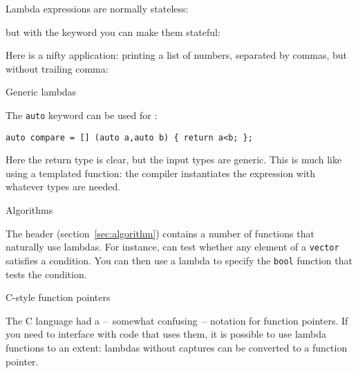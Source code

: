 Lambda expressions are normally stateless:


but with the  keyword you can
make them stateful:


Here is a nifty application: printing a list of numbers,
separated by commas, but without trailing comma:
%

 {Generic lambdas}
\label{sec:lambda-generic}

The \lstinline{auto} keyword can be used for
:
\begin{lstlisting}
auto compare = [] (auto a,auto b) { return a<b; };
\end{lstlisting}
Here the return type is clear, but the input types are generic.
This is much like using a templated function:
the compiler instantiates the expression with whatever types are needed.

 {Algorithms}

The  header (section~\ref{sec:algorithm})
contains a number of functions that
naturally use lambdas. For instance,  can test
whether any element of a \lstinline{vector} satisfies a condition.
You can then use a lambda to specify the \lstinline{bool} function
that tests the condition.

 {C-style function pointers}

The C language had a --~somewhat confusing~-- notation
for function pointers.
If you need to interface with code that uses them,
it is possible to use lambda functions to an extent:
lambdas without captures can be converted to a function pointer.

